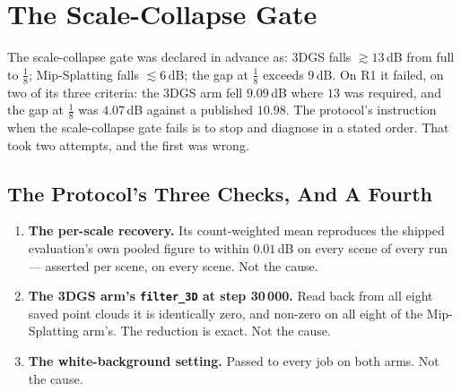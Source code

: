 


\section{The Scale-Collapse Gate}
\label{sec:g2}

The scale-collapse gate was declared in advance as: 3DGS falls $\gtrsim13$\,dB from full to
$\tfrac18$; Mip-Splatting falls $\lesssim6$\,dB; the gap at $\tfrac18$ exceeds
$9$\,dB. On R1 it failed, on two of its three criteria: the 3DGS arm fell $9.09$\,dB
where $13$ was required, and the gap at $\tfrac18$ was $4.07$\,dB against a
published $10.98$. The protocol's instruction when the scale-collapse gate fails is to stop and
diagnose in a stated order. That took two attempts, and the first was wrong.

\subsection*{The Protocol's Three Checks, And A Fourth}

\begin{enumerate}[leftmargin=1.4em,itemsep=2pt]
  \item \textbf{The per-scale recovery.} Its count-weighted mean reproduces
        the shipped evaluation's own pooled figure to within $0.01$\,dB on every
        scene of every run --- asserted per scene, on every scene. Not the
        cause.
  \item \textbf{The 3DGS arm's \texttt{filter\_3D} at step 30\,000.} Read back from all
        eight saved point clouds it is identically zero, and non-zero on all
        eight of the Mip-Splatting arm's. The reduction is exact. Not the cause.
  \item \textbf{The white-background setting.} Passed to every job on both
        arms. Not the cause.
\end{enumerate}


